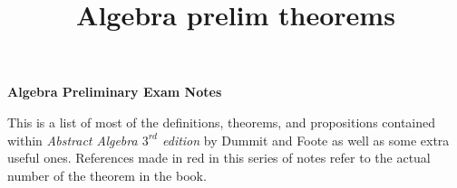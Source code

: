 
\title{Algebra prelim theorems}





\begin{center}
\textbf{\Large Algebra Preliminary Exam Notes}
\end{center}

This is a list of most of the definitions, theorems, and propositions contained within \textit{Abstract Algebra $3^{rd}$ edition} by Dummit and Foote as well as some extra useful ones. References made in red in this series of notes refer to the actual number of the theorem in the book.\\

\tableofcontents
\newpage







